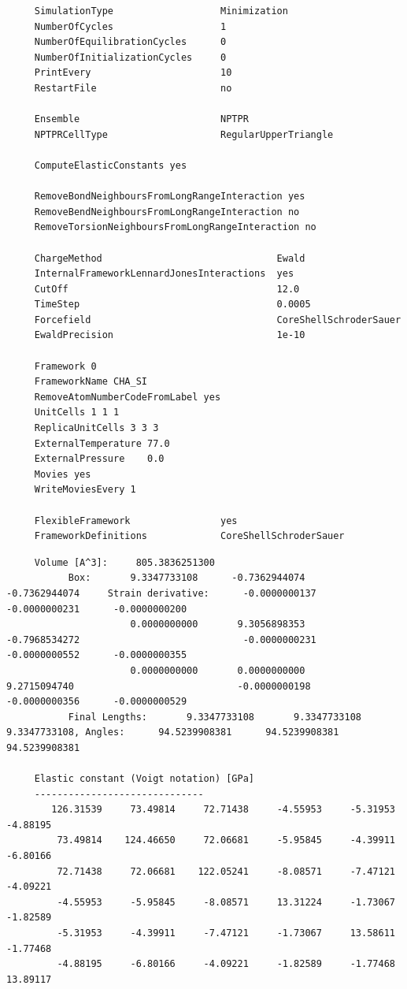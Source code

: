 \begin{tiny}
\begin{verbatim}
     SimulationType                   Minimization
     NumberOfCycles                   1
     NumberOfEquilibrationCycles      0
     NumberOfInitializationCycles     0
     PrintEvery                       10
     RestartFile                      no
     
     Ensemble                         NPTPR
     NPTPRCellType                    RegularUpperTriangle
     
     ComputeElasticConstants yes
     
     RemoveBondNeighboursFromLongRangeInteraction yes
     RemoveBendNeighboursFromLongRangeInteraction no
     RemoveTorsionNeighboursFromLongRangeInteraction no
     
     ChargeMethod                               Ewald
     InternalFrameworkLennardJonesInteractions  yes
     CutOff                                     12.0
     TimeStep                                   0.0005
     Forcefield                                 CoreShellSchroderSauer
     EwaldPrecision                             1e-10
     
     Framework 0
     FrameworkName CHA_SI
     RemoveAtomNumberCodeFromLabel yes
     UnitCells 1 1 1
     ReplicaUnitCells 3 3 3
     ExternalTemperature 77.0
     ExternalPressure    0.0
     Movies yes
     WriteMoviesEvery 1
     
     FlexibleFramework                yes
     FrameworkDefinitions             CoreShellSchroderSauer
\end{verbatim}
\end{tiny}

\begin{tiny}
\begin{verbatim}
     Volume [A^3]:     805.3836251300
           Box:       9.3347733108      -0.7362944074      -0.7362944074     Strain derivative:      -0.0000000137      -0.0000000231      -0.0000000200
                      0.0000000000       9.3056898353      -0.7968534272                             -0.0000000231      -0.0000000552      -0.0000000355
                      0.0000000000       0.0000000000       9.2715094740                             -0.0000000198      -0.0000000356      -0.0000000529
           Final Lengths:       9.3347733108       9.3347733108       9.3347733108, Angles:      94.5239908381      94.5239908381      94.5239908381

     Elastic constant (Voigt notation) [GPa]
     ------------------------------
        126.31539     73.49814     72.71438     -4.55953     -5.31953     -4.88195
         73.49814    124.46650     72.06681     -5.95845     -4.39911     -6.80166
         72.71438     72.06681    122.05241     -8.08571     -7.47121     -4.09221
         -4.55953     -5.95845     -8.08571     13.31224     -1.73067     -1.82589
         -5.31953     -4.39911     -7.47121     -1.73067     13.58611     -1.77468
         -4.88195     -6.80166     -4.09221     -1.82589     -1.77468     13.89117
\end{verbatim}
\end{tiny}

